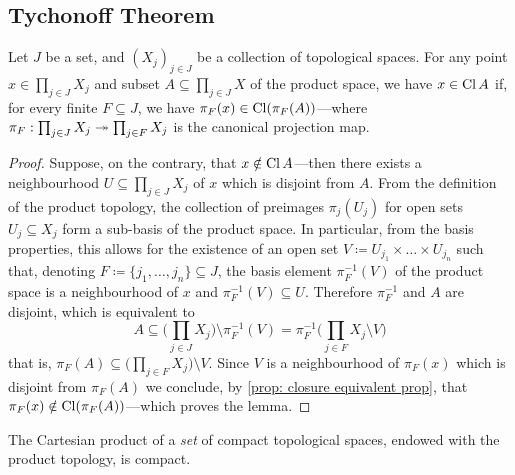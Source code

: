 \subsection{Tychonoff Theorem}

\begin{lemma}
\label{lem:tychonoff-theorem-pre-lemma}
Let \(J\) be a set, and \((X_{j})_{j \in J}\) be a collection of topological
spaces. For any point \(x \in \prod_{j \in J} X_j\) and subset
\(A \subseteq \prod_{j \in J} X\) of the product space, we have \(x \in \operatorname{Cl} A\)
if, for every finite \(F \subseteq J\), we have
\(\pi_F(x) \in \operatorname{Cl}(\pi_F(A))\)---where
\(\pi_F: \prod_{j \in J} X_j \twoheadrightarrow \prod_{j \in F} X_j\) is the canonical
projection map.
\end{lemma}

\begin{proof}
Suppose, on the contrary, that \(x \notin \operatorname{Cl} A\)---then there exists a
neighbourhood \(U \subseteq \prod_{j \in J} X_j\) of \(x\) which is disjoint
from \(A\). From the definition of the product topology, the collection of
preimages \(\pi_j(U_j)\) for open sets \(U_j \subseteq X_j\) form a sub-basis of
the product space. In particular, from the basis properties, this allows for the
existence of an open set \(V \coloneq U_{j_1} \times \dots \times U_{j_n}\) such
that, denoting \(F \coloneq \{j_1, \dots, j_n\} \subseteq J\), the basis element
\(\pi^{-1}_F(V)\) of the product space is a neighbourhood of \(x\) and
\(\pi_F^{-1}(V) \subseteq U\). Therefore \(\pi_F^{-1}\) and \(A\) are disjoint,
which is equivalent to
\[A \subseteq \bigg( \prod_{j \in J} X_j \bigg) \setminus \pi_F^{-1}(V) =
\pi_F^{-1}\bigg( \prod_{j \in F} X_j \setminus V \bigg)
\]
that is, \(\pi_F(A) \subseteq \big( \prod_{j \in F} X_j \big) \setminus
V\). Since \(V\) is a neighbourhood of \(\pi_F(x)\) which is disjoint from
\(\pi_F(A)\) we conclude, by \cref{prop: closure equivalent prop}, that
\(\pi_F(x) \notin \operatorname{Cl}(\pi_F(A))\)---which proves the lemma.
\end{proof}

\begin{theorem}[Tychonoff]
\label{thm:tychonoff-theorem}
The Cartesian product of a \emph{set} of compact topological spaces, endowed
with the product topology, is compact.
\end{theorem}

